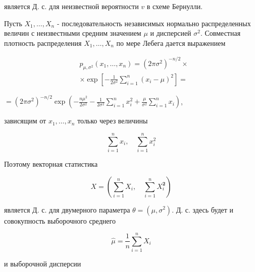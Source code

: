 \documentclass[10pt]{article}
\begin{document}
является Д. с. для неизвестной вероятности $v$ в схеме Бернулли.



Пусть $X_{1}, \ldots, X_{n}$ - последовательность независимых нормально распределенных величин с неизвестными средним значением $\mu$ и дисперсией $\sigma^{2}$. Совместная плотность распределения $X_{1}, \ldots, X_{n}$ по мере Лебега дается выражением



\[

\begin{aligned}

& p_{\mu, \sigma^{2}}\left(x_{1}, \ldots, x_{n}\right)=\left(2 \pi \sigma^{2}\right)^{-n / 2} \times \\

& \times \exp \left[-\frac{1}{2 \sigma^{2}} \sum_{i=1}^{n}\left(x_{i}-\mu\right)^{2}\right]=

\end{aligned}

\]



$=\left(2 \pi \sigma^{2}\right)^{-n / 2} \exp \left(-\frac{n \mu^{2}}{2 \sigma^{2}}-\frac{1}{2 \sigma^{2}} \sum_{i=1}^{n} x_{i}^{2}+\frac{\mu}{\sigma^{2}} \sum_{i=1}^{n} x_{i}\right)$,



зависящим от $x_{1}, \ldots, x_{n}$ только через величины



\[

\sum_{i=1}^{n} x_{i}, \quad \sum_{i=1}^{n} x_{i}^{2}

\]



Поэтому векторная статистика



\[

X=\left(\sum_{i=1}^{n} X_{i}, \quad \sum_{i=1}^{n} X_{i}^{\mathbf{2}}\right)

\]



является Д. с. для двумерного параметра $\theta=\left(\mu, \sigma^{2}\right)$. Д. с. здесь будет и совокупность выборочного среднего



\[

\hat{\mu}=\frac{1}{n} \sum_{i=1}^{n} X_{i}

\]



и выборочной дисперсии
\end{document}
